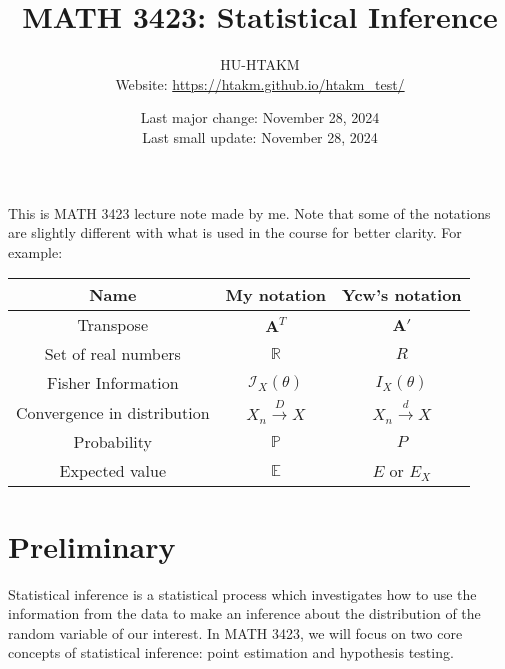 \documentclass{huhtakm-template-book-v2}
\title{
	\Huge MATH 3423: Statistical Inference
}
\author{
	HU-HTAKM\\
	\small Website: \url{https://htakm.github.io/htakm_test/}
}
\date{
	Last major change: November 28, 2024\\
	Last small update: November 28, 2024
}
\DeclareMathOperator{\prob}{\mathbb{P}}
\DeclareMathOperator{\E}{\mathbb{E}}
\begin{document}
\maketitle
This is MATH 3423 lecture note made by me. Note that some of the notations are slightly different with what is used in the course for better clarity. For example:\\
\begin{tabular}{||c|c|c||}
	\hline
	Name & My notation & Ycw's notation\\
	\hline
	Transpose & $\mathbf{A}^{T}$ &  $\mathbf{A}'$\\
	Set of real numbers & $\mathbb{R}$ & $R$\\
	Fisher Information & $\mathcal{I}_{X}(\theta)$ & $I_{X}(\theta)$\\
	Convergence in distribution & $X_{n}\xrightarrow{D}X$ & $X_{n}\xrightarrow{d}X$\\
	Probability & $\prob$ & $P$\\
	Expected value & $\E$ & $E$ or $E_{X}$\\
	\hline
\end{tabular}
\tableofcontents
\chapter{Preliminary}
Statistical inference is a statistical process which investigates how to use the information from the data to make an inference about the distribution of the random variable of our interest. In MATH 3423, we will focus on two core concepts of statistical inference: point estimation and hypothesis testing.
\end{document}
